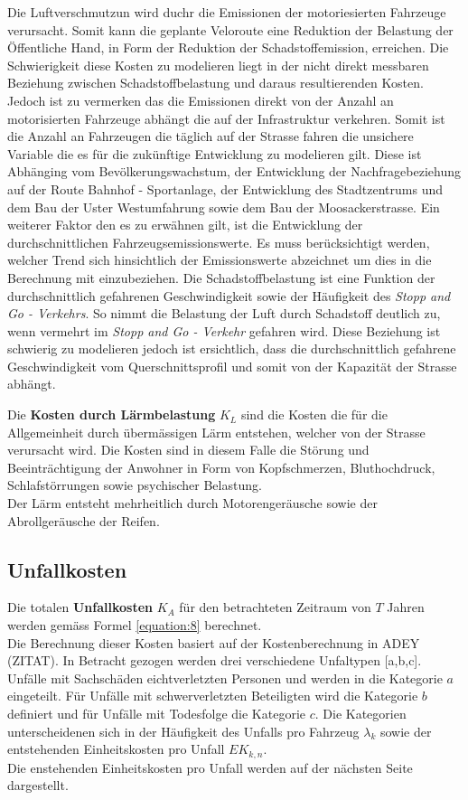 Die Luftverschmutzun wird duchr die Emissionen der motoriesierten Fahrzeuge verursacht. Somit kann die geplante Veloroute eine Reduktion der Belastung der Öffentliche Hand, in Form der Reduktion der Schadstoffemission, erreichen. 	
Die Schwierigkeit diese Kosten zu modelieren liegt in der nicht direkt messbaren Beziehung zwischen Schadstoffbelastung und daraus resultierenden Kosten. Jedoch ist zu vermerken das die Emissionen direkt von der Anzahl an motorisierten Fahrzeuge abhängt die auf der Infrastruktur verkehren. Somit ist die Anzahl an Fahrzeugen die täglich auf der Strasse fahren die unsichere Variable die es für die zukünftige Entwicklung zu modelieren gilt. 
Diese ist Abhänging vom Bevölkerungswachstum, der Entwicklung der Nachfragebeziehung auf der Route Bahnhof - Sportanlage, der Entwicklung des Stadtzentrums und dem Bau der Uster Westumfahrung sowie dem Bau der Moosackerstrasse. Ein weiterer Faktor den es zu erwähnen gilt, ist die Entwicklung der durchschnittlichen Fahrzeugsemissionswerte. Es muss berücksichtigt werden, welcher Trend sich hinsichtlich der Emissionswerte abzeichnet um dies in die Berechnung mit einzubeziehen. 
Die Schadstoffbelastung ist eine Funktion der durchschnittlich gefahrenen Geschwindigkeit sowie der Häufigkeit des \textit{Stopp and Go - Verkehrs}. So nimmt die Belastung der Luft durch Schadstoff deutlich zu, wenn vermehrt im \textit{Stopp and Go - Verkehr} gefahren wird. Diese Beziehung ist schwierig zu modelieren jedoch ist ersichtlich, dass die durchschnittlich gefahrene Geschwindigkeit vom Querschnittsprofil und somit von der Kapazität der Strasse abhängt. 

Die \textbf{Kosten durch Lärmbelastung} $K_{L}$ sind die Kosten die für die Allgemeinheit durch übermässigen Lärm entstehen, welcher von der Strasse verursacht wird. 
Die Kosten sind in diesem Falle die Störung und Beeinträchtigung der Anwohner in Form von Kopfschmerzen, Bluthochdruck, Schlafstörrungen sowie psychischer Belastung. \\
Der Lärm entsteht mehrheitlich durch Motorengeräusche sowie der Abrollgeräusche der Reifen. 

\newpage

\subsection{Unfallkosten}
\label{sec:Unfallkosten}

Die totalen \textbf{Unfallkosten} $K_{A}$ für den betrachteten Zeitraum von $T$ Jahren werden gemäss Formel \ref{equation:8} berechnet. \\
Die Berechnung dieser Kosten basiert auf der Kostenberechnung in ADEY (ZITAT).
In Betracht gezogen werden drei verschiedene Unfaltypen [a,b,c]. Unfälle mit Sachschäden eichtverletzten Personen und werden in die Kategorie $a$ eingeteilt. Für Unfälle mit schwerverletzten Beteiligten wird die Kategorie $b$ definiert und für Unfälle mit Todesfolge die Kategorie $c$. Die Kategorien unterscheidenen sich in der Häufigkeit des Unfalls pro Fahrzeug \( \lambda_{k} \) sowie der entstehenden Einheitskosten pro Unfall $EK_{k,n}$. \\
Die enstehenden Einheitskosten pro Unfall werden auf der nächsten Seite dargestellt.

